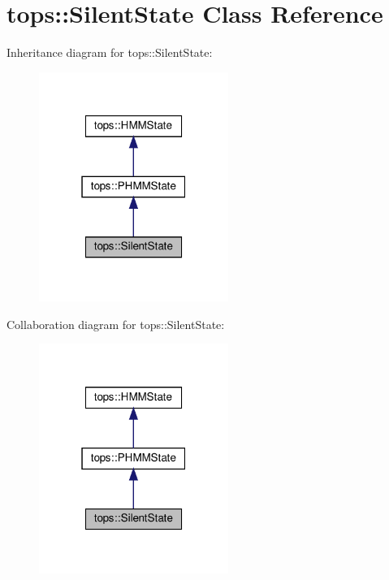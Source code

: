 \hypertarget{classtops_1_1SilentState}{}\section{tops\+:\+:Silent\+State Class Reference}
\label{classtops_1_1SilentState}


Inheritance diagram for tops\+:\+:Silent\+State\+:
\nopagebreak
\begin{figure}[H]
\begin{center}
\leavevmode
\includegraphics[width=175pt]{classtops_1_1SilentState__inherit__graph}
\end{center}
\end{figure}


Collaboration diagram for tops\+:\+:Silent\+State\+:
\nopagebreak
\begin{figure}[H]
\begin{center}
\leavevmode
\includegraphics[width=175pt]{classtops_1_1SilentState__coll__graph}
\end{center}
\end{figure}

